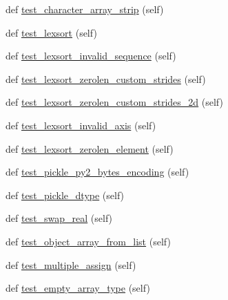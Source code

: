 \begin{DoxyCompactItemize}
\item 
def \hyperlink{classnumpy_1_1core_1_1tests_1_1test__regression_1_1TestRegression_a54001b3a3078fd5788d4b80a944a6b57}{test\+\_\+character\+\_\+array\+\_\+strip} (self)
\item 
def \hyperlink{classnumpy_1_1core_1_1tests_1_1test__regression_1_1TestRegression_aa1314c2ef43e123301529b7c9d7e61a0}{test\+\_\+lexsort} (self)
\item 
def \hyperlink{classnumpy_1_1core_1_1tests_1_1test__regression_1_1TestRegression_ab89ef1618a8b2cbb4ba42891bc18980e}{test\+\_\+lexsort\+\_\+invalid\+\_\+sequence} (self)
\item 
def \hyperlink{classnumpy_1_1core_1_1tests_1_1test__regression_1_1TestRegression_a5cfd32a8360fd26e67c489d0c72d6d62}{test\+\_\+lexsort\+\_\+zerolen\+\_\+custom\+\_\+strides} (self)
\item 
def \hyperlink{classnumpy_1_1core_1_1tests_1_1test__regression_1_1TestRegression_a341c1642bb1336f0346f22687afdc0c1}{test\+\_\+lexsort\+\_\+zerolen\+\_\+custom\+\_\+strides\+\_\+2d} (self)
\item 
def \hyperlink{classnumpy_1_1core_1_1tests_1_1test__regression_1_1TestRegression_a124d29119e5d39b55bd1814d3208ce03}{test\+\_\+lexsort\+\_\+invalid\+\_\+axis} (self)
\item 
def \hyperlink{classnumpy_1_1core_1_1tests_1_1test__regression_1_1TestRegression_a1e6e32d989d09bb1b3fe21b2e0b85e9e}{test\+\_\+lexsort\+\_\+zerolen\+\_\+element} (self)
\item 
def \hyperlink{classnumpy_1_1core_1_1tests_1_1test__regression_1_1TestRegression_af470d2ab3c7a67707f7b0eb61c321ccf}{test\+\_\+pickle\+\_\+py2\+\_\+bytes\+\_\+encoding} (self)
\item 
def \hyperlink{classnumpy_1_1core_1_1tests_1_1test__regression_1_1TestRegression_ae06f010b1667a29783b5ec979e3e19c6}{test\+\_\+pickle\+\_\+dtype} (self)
\item 
def \hyperlink{classnumpy_1_1core_1_1tests_1_1test__regression_1_1TestRegression_a8f2d3789e07f53cdff7beae1950e5596}{test\+\_\+swap\+\_\+real} (self)
\item 
def \hyperlink{classnumpy_1_1core_1_1tests_1_1test__regression_1_1TestRegression_a9db1296b53130ef0ba7f8a787a45d046}{test\+\_\+object\+\_\+array\+\_\+from\+\_\+list} (self)
\item 
def \hyperlink{classnumpy_1_1core_1_1tests_1_1test__regression_1_1TestRegression_a3bcb383e2bfb2e03f7d8e024855c0b1b}{test\+\_\+multiple\+\_\+assign} (self)
\item 
def \hyperlink{classnumpy_1_1core_1_1tests_1_1test__regression_1_1TestRegression_a50bda806bd5f63923f2a946dda4b5a13}{test\+\_\+empty\+\_\+array\+\_\+type} (self)

\end{DoxyCompactItemize}
